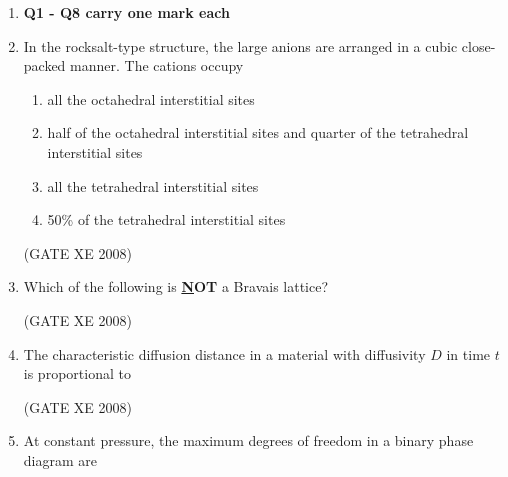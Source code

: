 \documentclass[12pt]{article}
\begin{document}
\begin{enumerate}
\item[] \textbf{Q1 - Q8 carry one mark each}

\item In the rocksalt-type structure, the large anions are arranged in a cubic close-packed manner. The cations occupy

\begin{enumerate}

\item  all the octahedral interstitial sites
\item  half of the octahedral interstitial sites and quarter of the tetrahedral interstitial sites
\item  all the tetrahedral interstitial sites
\item  50\% of the tetrahedral interstitial sites
\end{enumerate}

(GATE XE 2008)
\item  Which of the following is \textbf{\underline NOT} a Bravais lattice?

\begin{enumerate}
\end{enumerate}

(GATE XE 2008)
\item The characteristic diffusion distance in a material with diffusivity $D$ in time $t$ is proportional to  

\begin{enumerate}
\end{enumerate}

    (GATE XE 2008)  
\item At constant pressure, the maximum degrees of freedom in a binary phase diagram are  


\end{enumerate}
\end{document}
